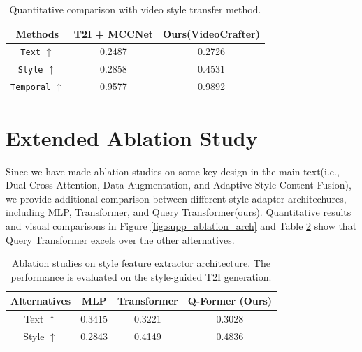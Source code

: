 \begin{table}[!h]
\centering
\caption{Quantitative comparison with video style transfer method.}
\vspace{-1em}
\label{tab:supp_comp_mccnet}
  \begin{tabular}{ccc} %
    \hline
    Methods & T2I + MCCNet & Ours(VideoCrafter) \\
    \hline
    \texttt{Text} $\uparrow$ & 0.2487 & 0.2726 \\
    \texttt{Style} $\uparrow$ & 0.2858 & 0.4531 \\
    \texttt{Temporal} $\uparrow$ & 0.9577 & 0.9892 \\
    \hline
  \end{tabular}
\end{table}


\section{Extended Ablation Study}
\label{sec:supp_extend_ablation}

Since we have made ablation studies on some key design in the main text(i.e., Dual Cross-Attention, Data Augmentation, and Adaptive Style-Content Fusion), we provide additional comparison between different style adapter architechures, including MLP, Transformer, and Query Transformer(ours). Quantitative results and visual comparisons in Figure \ref{fig:supp_ablation_arch} and Table \ref{tab:supp_ablation_arch} show that Query Transformer excels over the other alternatives.

\begin{table}[!h]
\centering
\caption{Ablation studies on style feature extractor architecture. The performance is evaluated on the style-guided T2I generation.}
\label{tab:supp_ablation_arch}
\vspace{-1em}
  \begin{tabular}{cccc} %
    \hline
    Alternatives & MLP & Transformer & Q-Former (Ours) \\
    \hline
    Text $\uparrow$ & 0.3415 & 0.3221 & 0.3028 \\
    Style $\uparrow$ & 0.2843 & 0.4149 & 0.4836 \\
    \hline
  \end{tabular}
  
\end{table}

